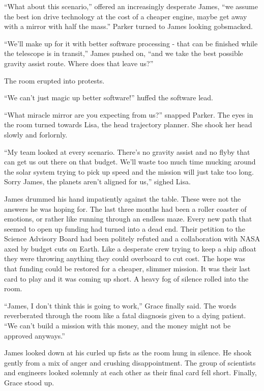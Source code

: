 \documentclass[openany, 12pt]{book} %
\begin{document}
``What about this scenario,'' offered an increasingly desperate James, ``we assume the best ion drive technology at the cost of a cheaper engine, maybe get away with a mirror with half the mass.'' Parker turned to James looking gobsmacked.

``We'll make up for it with better software processing - that can be finished while the telescope is in transit,'' James pushed on, ``and we take the best possible gravity assist route. Where does that leave us?''

The room erupted into protests.

``We can't just magic up better software!'' huffed the software lead.

``What miracle mirror are you expecting from us?'' snapped Parker. The eyes in the room turned towards Lisa, the head trajectory planner. She shook her head slowly and forlornly.

``My team looked at every scenario. There's no gravity assist and no flyby that can get us out there on that budget. We'll waste too much time mucking around the solar system trying to pick up speed and the mission will just take too long. Sorry James, the planets aren't aligned for us,'' sighed Lisa.

James drummed his hand impatiently against the table. These were not the answers he was hoping for. The last three months had been a roller coaster of emotions, or rather like running through an endless maze. Every new path that seemed to open up funding had turned into a dead end. Their petition to the Science Advisory Board had been politely refuted and a collaboration with NASA axed by budget cuts on Earth. Like a desperate crew trying to keep a ship afloat they were throwing anything they could overboard to cut cost. The hope was that funding could be restored for a cheaper, slimmer mission. It was their last card to play and it was coming up short. A heavy fog of silence rolled into the room.

``James, I don't think this is going to work,'' Grace finally said. The words reverberated through the room like a fatal diagnosis given to a dying patient. ``We can't build a mission with this money, and the money might not be approved anyways.''

James looked down at his curled up fists as the room hung in silence. He shook gently from a mix of anger and crushing disappointment. The group of scientists and engineers looked solemnly at each other as their final card fell short. Finally, Grace stood up.
\end{document}

